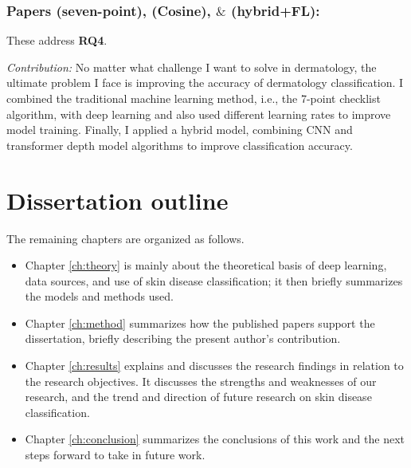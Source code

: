 \subsubsection {Papers \uppercase\expandafter{} (seven-point), \uppercase\expandafter{} (Cosine), $\&$ \uppercase\expandafter{} (hybrid+FL):}
These address \textbf{RQ4}. 

\textit{Contribution: }
No matter what challenge I want to solve in dermatology, the ultimate problem I face is improving the accuracy of dermatology classification. I combined the traditional machine learning method, i.e., the 7-point checklist algorithm,  with deep learning and also used different learning rates to improve model training. Finally, I applied a hybrid model, combining CNN and transformer depth model algorithms to improve classification accuracy.


\section{Dissertation outline}
The remaining chapters are organized as follows.
\begin{itemize}
  \item Chapter \ref{ch:theory} is mainly about the theoretical basis of deep learning, data sources, and use of skin disease classification; it then briefly summarizes the models and methods used.
  \item Chapter \ref{ch:method} summarizes how the published papers support the dissertation, briefly describing the present author's contribution.
  \item Chapter \ref{ch:results} explains and discusses the research findings in relation to the research objectives. It discusses the strengths and weaknesses of our research, and the trend and direction of future research on skin disease classification.
  \item Chapter \ref{ch:conclusion} summarizes the conclusions of this work and the next steps forward to take in future work.
\end{itemize}
   


